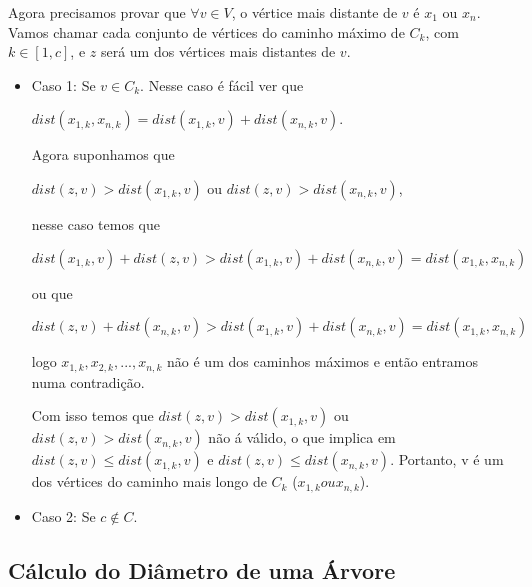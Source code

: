 \documentclass[a4paper,12pt]{article}
\begin{document}
        Agora precisamos provar que $\forall v \in V$, o vértice mais distante
        de $v$ é $x_1$ ou $x_n$.
        Vamos chamar cada conjunto de vértices do caminho máximo de $C_k$, com $k \in [1, c]$, e $z$ 
        será um dos vértices mais distantes de $v$.

        \begin{itemize}
            \item Caso 1: Se $v \in C_k$.
            Nesse caso é fácil ver que 

            $dist(x_{1, k}, x_{n, k})=dist(x_{1, k}, v)+dist(x_{n, k}, v)$.

            Agora suponhamos que 

            $dist(z, v)>dist(x_{1, k}, v)$ ou $dist(z, v)>dist(x_{n, k}, v)$,
            
            nesse caso temos que 
            
            $dist(x_{1, k}, v)+dist(z, v)>dist(x_{1, k}, v)+dist(x_{n, k}, v)=dist(x_{1, k}, x_{n, k})$
            
            ou que 
            
            $dist(z, v)+dist(x_{n, k}, v)>dist(x_{1, k}, v)+dist(x_{n, k}, v)=dist(x_{1, k}, x_{n, k})$
            
            logo $x_{1, k}, x_{2, k},..., x_{n, k}$ não é um dos caminhos máximos e então entramos numa contradição.

            Com isso temos que $dist(z, v)>dist(x_{1, k}, v)$ ou $dist(z, v)>dist(x_{n, k}, v)$ não á válido,
            o que implica em $dist(z, v)\le dist(x_{1, k}, v)$ e $dist(z, v)\le dist(x_{n, k}, v)$. Portanto,
            v é um dos vértices do caminho mais longo de $C_k$ ($x_{1, k} ou x_{n, k}$).

            \item Caso 2: Se $c \notin C$. 

        \end{itemize}
        
    \subsection{Cálculo do Diâmetro de uma Árvore}
    


\newpage
    
    
    
\end{document}
